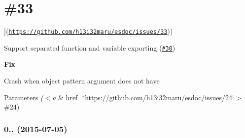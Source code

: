 \hypertarget{#33-example}{}\section{\#33}
\mbox{]}(\href{https://github.com/h13i32maru/esdoc/issues/33}{\tt https\+://github.\+com/h13i32maru/esdoc/issues/33}))
\begin{DoxyItemize}
\item Support separated function and variable exporting (\href{https://github.com/h13i32maru/esdoc/issues/30}{\tt \#30})
\end{DoxyItemize}

{\bfseries Fix}
\begin{DoxyItemize}
\item Crash when object pattern argument does not have
\begin{DoxyParams}{Parameters}
{\em ($<$a} & href=\char`\"{}https\+://github.\+com/h13i32maru/esdoc/issues/24\char`\"{}$>$\#24)\\
\hline
\end{DoxyParams}
\subsubsection*{0.. (2015-\/07-\/05)}
\end{DoxyItemize}


